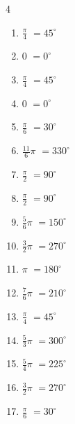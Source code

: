 \begin{multicols}{4}
\begin{enumerate}
  \item $\displaystyle \frac{\pi}{4}$
        $\displaystyle =45^{\circ}$

  \item $\displaystyle 0$
        $\displaystyle =0^{\circ}$

  \item $\displaystyle \frac{\pi}{4}$
        $\displaystyle =45^{\circ}$

  \item $\displaystyle 0$
        $\displaystyle =0^{\circ}$

  \item $\displaystyle \frac{\pi}{6}$
        $\displaystyle =30^{\circ}$

  \item $\displaystyle \frac{11}{6}\pi$
        $\displaystyle =330^{\circ}$

  \item $\displaystyle \frac{\pi}{2}$
        $\displaystyle =90^{\circ}$

  \item $\displaystyle \frac{\pi}{2}$
        $\displaystyle =90^{\circ}$

\columnbreak %

\resetques

  \item $\displaystyle \frac{5}{6}\pi$
        $\displaystyle =150^{\circ}$

  \item $\displaystyle \frac{3}{2}\pi$
        $\displaystyle =270^{\circ}$

  \item $\displaystyle \pi$
        $\displaystyle =180^{\circ}$

  \item $\displaystyle \frac{7}{6}\pi$
        $\displaystyle =210^{\circ}$

  \item $\displaystyle \frac{\pi}{4}$
        $\displaystyle =45^{\circ}$

  \item $\displaystyle \frac{5}{3}\pi$
        $\displaystyle =300^{\circ}$

  \item $\displaystyle \frac{5}{4}\pi$
        $\displaystyle =225^{\circ}$

  \item $\displaystyle \frac{3}{2}\pi$
        $\displaystyle =270^{\circ}$

  \item $\displaystyle \frac{\pi}{6}$
        $\displaystyle =30^{\circ}$


\end{enumerate}
\end{multicols}
